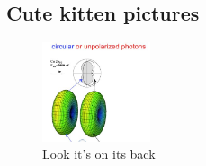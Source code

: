 \documentclass{article}%
\begin{document}
%
\subsection{Cute kitten pictures}%
\label{subsec:Cutekittenpictures}%


\begin{figure}[h!]%
\centering%
\includegraphics[width=120px]{kitten.jpg}%
\caption{Look it's on its back}%
\end{figure}

%
\end{document}

